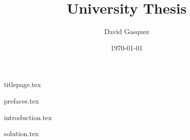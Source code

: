 \documentclass[
    a4paper,
    12pt
]{report}
\title{University Thesis}
\author{David Gasquez}
\date{\today}
\begin{document}
{titlepage.tex}

{prefaces.tex}

{introduction.tex}

{solution.tex}
\end{document}
